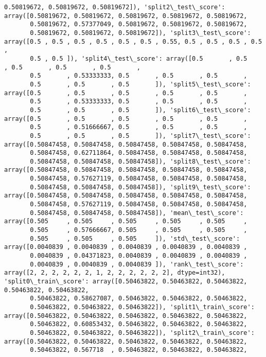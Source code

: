 \documentclass[11pt]{article}
\begin{document}
\begin{Verbatim}[commandchars=\\\{\}]
       0.50819672, 0.50819672, 0.50819672]), 'split2\_test\_score': array([0.50819672, 0.50819672, 0.50819672, 0.50819672, 0.50819672,
       0.50819672, 0.57377049, 0.50819672, 0.50819672, 0.50819672,
       0.50819672, 0.50819672, 0.50819672]), 'split3\_test\_score': array([0.5 , 0.5 , 0.5 , 0.5 , 0.5 , 0.5 , 0.55, 0.5 , 0.5 , 0.5 , 0.5 ,
       0.5 , 0.5 ]), 'split4\_test\_score': array([0.5       , 0.5       , 0.5       , 0.5       , 0.5       ,
       0.5       , 0.53333333, 0.5       , 0.5       , 0.5       ,
       0.5       , 0.5       , 0.5       ]), 'split5\_test\_score': array([0.5       , 0.5       , 0.5       , 0.5       , 0.5       ,
       0.5       , 0.53333333, 0.5       , 0.5       , 0.5       ,
       0.5       , 0.5       , 0.5       ]), 'split6\_test\_score': array([0.5       , 0.5       , 0.5       , 0.5       , 0.5       ,
       0.5       , 0.51666667, 0.5       , 0.5       , 0.5       ,
       0.5       , 0.5       , 0.5       ]), 'split7\_test\_score': array([0.50847458, 0.50847458, 0.50847458, 0.50847458, 0.50847458,
       0.50847458, 0.62711864, 0.50847458, 0.50847458, 0.50847458,
       0.50847458, 0.50847458, 0.50847458]), 'split8\_test\_score': array([0.50847458, 0.50847458, 0.50847458, 0.50847458, 0.50847458,
       0.50847458, 0.57627119, 0.50847458, 0.50847458, 0.50847458,
       0.50847458, 0.50847458, 0.50847458]), 'split9\_test\_score': array([0.50847458, 0.50847458, 0.50847458, 0.50847458, 0.50847458,
       0.50847458, 0.57627119, 0.50847458, 0.50847458, 0.50847458,
       0.50847458, 0.50847458, 0.50847458]), 'mean\_test\_score': array([0.505     , 0.505     , 0.505     , 0.505     , 0.505     ,
       0.505     , 0.57666667, 0.505     , 0.505     , 0.505     ,
       0.505     , 0.505     , 0.505     ]), 'std\_test\_score': array([0.0040839 , 0.0040839 , 0.0040839 , 0.0040839 , 0.0040839 ,
       0.0040839 , 0.04371823, 0.0040839 , 0.0040839 , 0.0040839 ,
       0.0040839 , 0.0040839 , 0.0040839 ]), 'rank\_test\_score': array([2, 2, 2, 2, 2, 2, 1, 2, 2, 2, 2, 2, 2], dtype=int32), 'split0\_train\_score': array([0.50463822, 0.50463822, 0.50463822, 0.50463822, 0.50463822,
       0.50463822, 0.58627087, 0.50463822, 0.50463822, 0.50463822,
       0.50463822, 0.50463822, 0.50463822]), 'split1\_train\_score': array([0.50463822, 0.50463822, 0.50463822, 0.50463822, 0.50463822,
       0.50463822, 0.60853432, 0.50463822, 0.50463822, 0.50463822,
       0.50463822, 0.50463822, 0.50463822]), 'split2\_train\_score': array([0.50463822, 0.50463822, 0.50463822, 0.50463822, 0.50463822,
       0.50463822, 0.567718  , 0.50463822, 0.50463822, 0.50463822,

\end{Verbatim}
\end{document}
